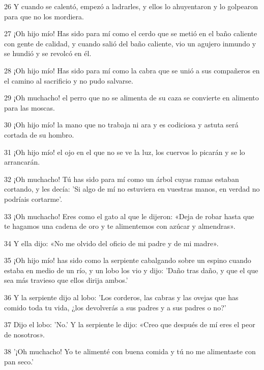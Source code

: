 \par 26 Y cuando se calentó, empezó a ladrarles, y ellos lo ahuyentaron y lo golpearon para que no los mordiera.

\par 27 ¡Oh hijo mío! Has sido para mí como el cerdo que se metió en el baño caliente con gente de calidad, y cuando salió del baño caliente, vio un agujero inmundo y se hundió y se revolcó en él.

\par 28 ¡Oh hijo mío! Has sido para mí como la cabra que se unió a sus compañeros en el camino al sacrificio y no pudo salvarse.

\par 29 ¡Oh muchacho! el perro que no se alimenta de su caza se convierte en alimento para las moscas.

\par 30 ¡Oh hijo mío! la mano que no trabaja ni ara y es codiciosa y astuta será cortada de su hombro.

\par 31 ¡Oh hijo mío! el ojo en el que no se ve la luz, los cuervos lo picarán y se lo arrancarán.

\par 32 ¡Oh muchacho! Tú has sido para mí como un árbol cuyas ramas estaban cortando, y les decía: 'Si algo de mí no estuviera en vuestras manos, en verdad no podríais cortarme'.

\par 33 ¡Oh muchacho! Eres como el gato al que le dijeron: «Deja de robar hasta que te hagamos una cadena de oro y te alimentemos con azúcar y almendras».

\par 34 Y ella dijo: «No me olvido del oficio de mi padre y de mi madre».

\par 35 ¡Oh hijo mío! has sido como la serpiente cabalgando sobre un espino cuando estaba en medio de un río, y un lobo los vio y dijo: 'Daño tras daño, y que el que sea más travieso que ellos dirija ambos.'

\par 36 Y la serpiente dijo al lobo: 'Los corderos, las cabras y las ovejas que has comido toda tu vida, ¿los devolverás a sus padres y a sus padres o no?'

\par 37 Dijo el lobo: 'No.' Y la serpiente le dijo: «Creo que después de mí eres el peor de nosotros».

\par 38 '¡Oh muchacho! Yo te alimenté con buena comida y tú no me alimentaste con pan seco.'

